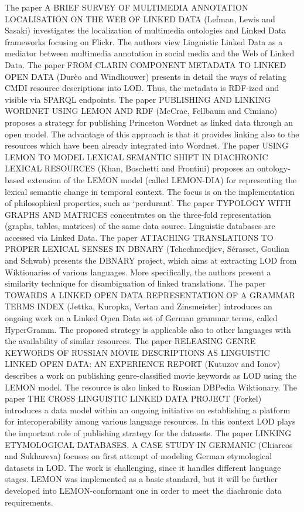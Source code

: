 The paper A BRIEF SURVEY OF MULTIMEDIA ANNOTATION LOCALISATION ON THE WEB OF LINKED 
DATA (Lefman, Lewis and Sasaki) investigates the localization of multimedia ontologies 
and Linked Data frameworks focusing on Flickr. The authors view Linguistic Linked 
Data as a mediator between multimedia annotation in social media and the Web of 
Linked Data. The paper FROM CLARIN COMPONENT METADATA TO LINKED OPEN DATA (Durèo 
and Windhouwer) presents in detail the ways of relating CMDI resource descriptions 
into LOD. Thus, the metadata is RDF-ized and visible via SPARQL endpoints. The 
paper PUBLISHING AND LINKING WORDNET USING LEMON AND RDF (McCrae, Fellbaum and 
Cimiano) proposes a strategy for publishing Princeton Wordnet as linked data through 
an open model. The advantage of this approach is that it provides linking also 
to the resources which have been already integrated into Wordnet. The paper USING 
LEMON TO MODEL LEXICAL SEMANTIC SHIFT IN DIACHRONIC LEXICAL RESOURCES (Khan, Boschetti 
and Frontini) proposes an ontology-based extension of the LEMON model (called LEMON-DIA) 
for representing the lexical semantic change in temporal context. The focus is 
on the implementation of philosophical properties, such as `perdurant'. The paper 
TYPOLOGY WITH GRAPHS AND MATRICES concentrates on the three-fold representation 
(graphs, tables, matrices) of the same data source. Linguistic databases are accessed 
via Linked Data. The paper ATTACHING TRANSLATIONS TO PROPER LEXICAL SENSES IN DBNARY 
(Tchechmedjiev, Sérasset, Goulian and Schwab) presents the DBNARY project, which 
aims at extracting LOD from Wiktionaries of various languages. More specifically, 
the authors present a similarity technique for disambiguation of linked translations. 
The paper TOWARDS A LINKED OPEN DATA REPRESENTATION OF A GRAMMAR TERMS INDEX (Jettka, 
Kuropka, Vertan and Zinsmeister) introduces an ongoing work on a Linked Open Data 
set of German grammar terms, called HyperGramm. The proposed strategy is applicable 
also to other languages with the availability of similar resources. The paper RELEASING 
GENRE KEYWORDS OF RUSSIAN MOVIE DESCRIPTIONS AS LINGUISTIC LINKED OPEN DATA: AN 
EXPERIENCE REPORT (Kutuzov and Ionov) describes a work on publishing genre-classified 
movie keywords as LOD using the LEMON model. The resource is also linked to Russian 
DBPedia Wiktionary. The paper THE CROSS LINGUISTIC LINKED DATA PROJECT (Forkel) 
introduces a data model within an ongoing initiative on establishing a platform 
for interoperability among various language resources. In this context LOD plays 
the important role of publishing strategy for the datasets. The paper LINKING ETYMOLOGICAL 
DATABASES. A CASE STUDY IN GERMANIC (Chiarcos and Sukhareva) focuses on first attempt 
of modeling German etymological datasets in LOD. The work is challenging, since 
it handles different language stages. LEMON was implemented as a basic standard, 
but it will be further developed into LEMON-conformant one in order to meet the 
diachronic data requirements.





